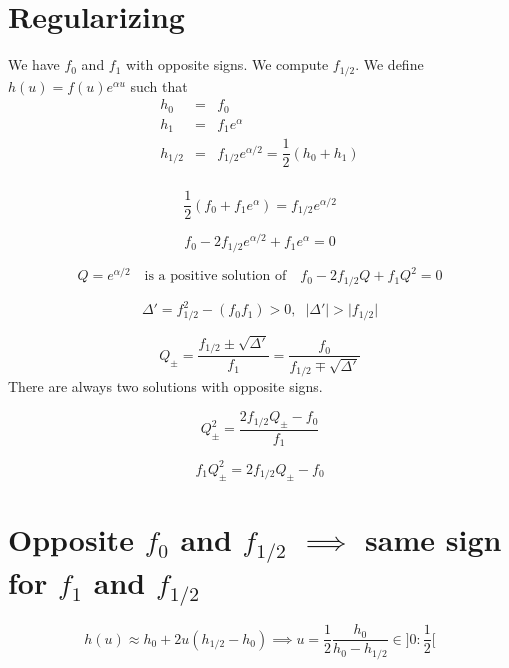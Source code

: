 \documentclass[aps,12pt]{revtex4}
\begin{document}
\section{Regularizing}
We have $f_0$ and $f_1$ with opposite signs.
We compute $f_{1/2}$.
We define $h(u) = f(u) e^{\alpha u}$ such that
\begin{equation}
\begin{array}{lcl}
h_0  & = & f_0  \\
h_1  & = & f_1 e^{\alpha} \\
h_{1/2} & = & f_{1/2} e^{\alpha/2} = \dfrac{1}{2}( h_0+h_1 )\\
\end{array}
\end{equation}
 
\begin{equation}
	\dfrac{1}{2}( f_0+f_1 e^\alpha ) = f_{1/2} e^{\alpha/2} 
\end{equation} 

\begin{equation}
	f_0 - 2 f_{1/2} e^{\alpha/2}  + f_1 e^\alpha = 0
\end{equation} 

$$
	 Q = e^{\alpha/2} \text{~~~is a positive solution of~~~} f_0 - 2 f_{1/2} Q  + f_1 Q^2 = 0
$$

\begin{equation}
	\Delta' = f_{1/2}^2 - (f_0f_1) > 0, \;\; \vert \Delta' \vert > \vert f_{1/2} \vert
\end{equation}

\begin{equation}
	Q_\pm = \dfrac{ f_{1/2} \pm \sqrt{\Delta'} }{f_1} = \dfrac{f_0}{f_{1/2} \mp \sqrt{\Delta'}}
\end{equation}
There are always two solutions with opposite signs.
 
\begin{equation}
	Q_\pm^2 = \dfrac{2f_{1/2}Q_\pm - f_0}{f_1}
\end{equation}
 
\begin{equation}
	f_1 Q_\pm^2 =  2f_{1/2}Q_\pm - f_0
\end{equation}

 
\section{Opposite $f_0$ and $f_{1/2}$ $\implies$ same sign for $f_1$ and $f_{1/2}$}
 
 $$
 	h(u) \approx h_0 + 2 u (h_{1/2}-h_0) \implies u = \dfrac{1}{2} \dfrac{h_0}{h_0-h_{1/2}} \in ]0:\frac{1}{2}[
 $$
  
\end{document}
